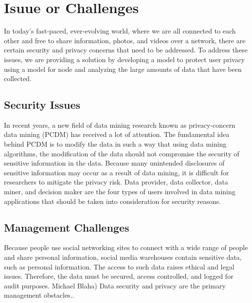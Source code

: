 \documentclass[openacc]{rsproca_new}%
\begin{document}
\rsbreak


\section{Isuue or Challenges}

In today's fast-paced, ever-evolving world, where we are all connected to each other and free to share information, photos, and videos over a network, there are certain security and privacy concerns that need to be addressed. To address these issues, we are providing a solution by developing a model to protect user privacy using a model for node and analyzing the large amounts of data that have been collected.

\subsection{Security Issues}
In recent years, a new field of data mining research known as privacy-concern data mining (PCDM) has received a lot of attention.
The fundamental idea behind PCDM is to modify the data in such a way that using data mining algorithms, the modification of the data should not compromise the security of sensitive information in the data.
Because many unintended disclosures of sensitive information may occur as a result of data mining, it is difficult for researchers to mitigate the privacy risk. Data provider, data collector, data miner, and decision maker are the four types of users involved in data mining applications that should be taken into consideration for security reasons.

\subsection{Management Challenges}
Because people use social networking sites to connect with a wide range of people and share personal information, social media warehouses contain sensitive data, such as personal information. The access to such data raises ethical and legal issues. Therefore, the data must be secured, access controlled, and logged for audit purposes. Michael Blaha) Data security and privacy are the primary management obstacles..



\end{document}
